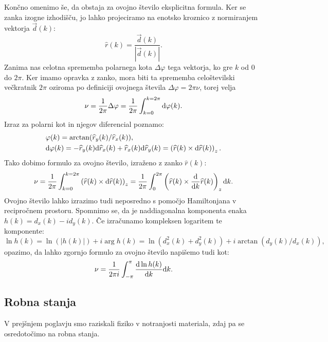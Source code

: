 Končno omenimo še, da obstaja za ovojno število eksplicitna formula.
Ker se zanka izogne izhodišču, jo lahko projeciramo na enotsko kroznico z normiranjem vektorja $\vec{d}(k)$:
\begin{equation}
\widehat{r}(k) = \frac{\vec{d}(k)}{|\vec{d}(k)|}.
\end{equation}
Zanima nas celotna sprememba polarnega kota $\Delta \varphi$ tega vektorja, ko gre $k$ od $0$ do $2 \pi$. Ker imamo opravka z zanko, mora biti ta sprememba celoštevilski večkratnik $2 \pi$ oziroma po definiciji ovojnega števila $\Delta \varphi = 2 \pi \nu$, torej velja
\begin{equation}
\nu = \frac{1}{2  \pi} \Delta \varphi = \frac{1}{2 \pi} \int_{k=0}^{k=2 \pi} \textup{d}\varphi(k).
\end{equation}
Izraz za polarni kot in njegov diferencial poznamo:
\begin{align}
&\varphi(k) = \arctan (\widehat{r}_y(k) / \widehat{r}_x(k)), \\
&\textup{d} \varphi(k) = - \widehat{r}_y(k) \textup{d} \widehat{r}_x(k) +  \widehat{r}_x(k) \textup{d} \widehat{r}_y(k) = \left( \widehat{r}(k) \times \textup{d} \widehat{r}(k) \right)_z.
\end{align}
Tako dobimo formulo za ovojno število, izraženo z zanko $\widehat{r}(k)$:
\begin{equation}
\nu = \frac{1}{2 \pi} \int_{k=0}^{k=2 \pi}  \left( \widehat{r}(k) \times \textup{d} \widehat{r}(k) \right)_z = \frac{1}{2 \pi} \int_0^{2 \pi} \left ( \widehat{r}(k) \times \frac{\textup{d}}{\textup{d} k} \widehat{r}(k) \right)_z \textup{d}k.
\end{equation}
Ovojno število lahko izrazimo tudi neposredno s pomočjo Hamiltonjana v recipročnem prostoru. Spomnimo se, da je naddiagonalna komponenta enaka
$h(k) = d_x (k) - i d_y(k)$. Če izračunamo kompleksen logaritem te komponente:
\begin{equation}
\ln h(k) = \ln (|h(k)|) + i \arg h(k) = \ln(d_x^2(k) + d_y^2(k)) + i \arctan (d_y(k) / d_x(k)),
\end{equation}
opazimo, da lahko zgornjo formulo za ovojno število napišemo tudi kot:
\begin{equation}
\nu = \frac{1}{2 \pi i} \int_{- \pi}^\pi \frac{\textup{d}  \ln h(k) }{\textup{d} k}\textup{d}k.
\end{equation}
\subsection{Robna stanja}
V prejšnjem poglavju smo raziskali fiziko v notranjosti materiala, zdaj pa se osredotočimo na robna stanja. 

